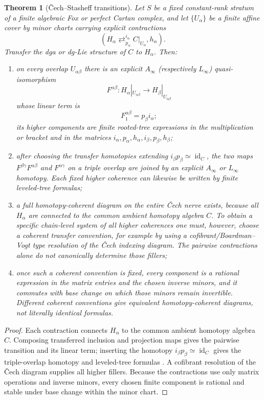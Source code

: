 \documentclass[11pt]{article}
\newtheorem{theorem}{Theorem}[section]
\theoremstyle{definition}
\begin{document}
\begin{theorem}[\v{C}ech--Stasheff transitions]\label{thm:cech-stasheff-gauges}
Let $S$ be a fixed constant-rank stratum of a finite algebraic Fox or perfect Cartan complex, and let $\{U_\alpha\}$ be a finite affine cover by minor charts carrying explicit contractions
\[
 (H_\alpha
 \mathop{\rightleftarrows}^{i_\alpha}_{p_\alpha}
 C|_{U_\alpha},h_\alpha).
\]
Transfer the dga or dg-Lie structure of $C$ to $H_\alpha$.  Then:
\begin{enumerate}[label=\textnormal{(\roman*)}]
\item on every overlap $U_{\alpha\beta}$ there is an explicit $A_\infty$ (respectively $L_\infty$) quasi-isomorphism
\[
 F^{\alpha\beta}:H_\alpha|_{U_{\alpha\beta}}
 \longrightarrow
 H_\beta|_{U_{\alpha\beta}}
\]
whose linear term is
\begin{equation}\label{eq:stashed-transition-linear}
 F^{\alpha\beta}_1=p_\beta i_\alpha;
\end{equation}
its higher components are finite rooted-tree expressions in the multiplication or bracket and in the matrices $i_\alpha,p_\alpha,h_\alpha,i_\beta,p_\beta,h_\beta$;
\item after choosing the transfer homotopies extending
$i_\beta p_\beta\simeq\operatorname{id}_C$, the two maps
$F^{\beta\gamma}F^{\alpha\beta}$ and $F^{\alpha\gamma}$ on a triple overlap are joined by an explicit $A_\infty$ or $L_\infty$ homotopy.  Each fixed higher coherence can likewise be written by finite leveled-tree formulas;
\item a full homotopy-coherent diagram on the entire \v{C}ech nerve exists, because all $H_\alpha$ are connected to the common ambient homotopy algebra $C$.  To obtain a specific chain-level system of all higher coherences one must, however, choose a coherent transfer convention, for example by using a cofibrant/Boardman--Vogt type resolution of the \v{C}ech indexing diagram.  The pairwise contractions alone do not canonically determine those fillers;
\item once such a coherent convention is fixed, every component is a rational expression in the matrix entries and the chosen inverse minors, and it commutes with base change on which those minors remain invertible.  Different coherent conventions give equivalent homotopy-coherent diagrams, not literally identical formulas.
\end{enumerate}
\end{theorem}

\begin{proof}
Each contraction connects $H_\alpha$ to the common ambient homotopy algebra $C$.  Composing transferred inclusion and projection maps gives the pairwise transition and its linear term; inserting the homotopy $i_\beta p_\beta\simeq\operatorname{id}_C$ gives the triple-overlap homotopy and leveled-tree formulas \cite{BurkeTransfer,ManettiPerturbation,VokrinekHPT}.  A cofibrant resolution of the \v{C}ech diagram supplies all higher fillers.  Because the contractions use only matrix operations and inverse minors, every chosen finite component is rational and stable under base change within the minor chart.
\end{proof}
\end{document}
